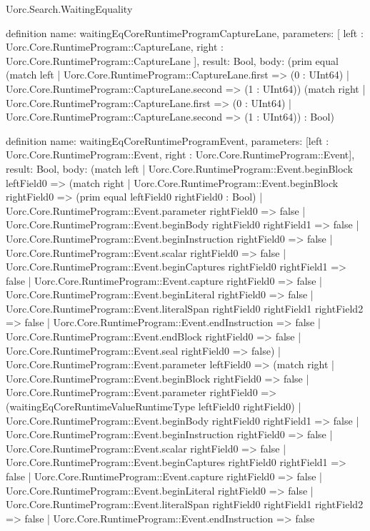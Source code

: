 \begin{lexlean}{Uorc.Search.WaitingEquality}
\begin{semanticmodule}
definition{
  name: waitingEqCoreRuntimeProgramCaptureLane,
  parameters: [
    left : Uorc.Core.RuntimeProgram::CaptureLane,
    right : Uorc.Core.RuntimeProgram::CaptureLane
  ],
  result: Bool,
  body: (prim equal (match left
    | Uorc.Core.RuntimeProgram::CaptureLane.first => (0 : UInt64)
    | Uorc.Core.RuntimeProgram::CaptureLane.second => (1 : UInt64)) (match right
    | Uorc.Core.RuntimeProgram::CaptureLane.first => (0 : UInt64)
    | Uorc.Core.RuntimeProgram::CaptureLane.second => (1 : UInt64)) : Bool)
}

definition{
  name: waitingEqCoreRuntimeProgramEvent,
  parameters: [left : Uorc.Core.RuntimeProgram::Event, right : Uorc.Core.RuntimeProgram::Event],
  result: Bool,
  body: (match left
    | Uorc.Core.RuntimeProgram::Event.beginBlock leftField0 => (match right
      | Uorc.Core.RuntimeProgram::Event.beginBlock rightField0 => (prim equal leftField0 rightField0 : Bool)
      | Uorc.Core.RuntimeProgram::Event.parameter rightField0 => false
      | Uorc.Core.RuntimeProgram::Event.beginBody rightField0 rightField1 => false
      | Uorc.Core.RuntimeProgram::Event.beginInstruction rightField0 => false
      | Uorc.Core.RuntimeProgram::Event.scalar rightField0 => false
      | Uorc.Core.RuntimeProgram::Event.beginCaptures rightField0 rightField1 => false
      | Uorc.Core.RuntimeProgram::Event.capture rightField0 => false
      | Uorc.Core.RuntimeProgram::Event.beginLiteral rightField0 => false
      | Uorc.Core.RuntimeProgram::Event.literalSpan rightField0 rightField1 rightField2 => false
      | Uorc.Core.RuntimeProgram::Event.endInstruction => false
      | Uorc.Core.RuntimeProgram::Event.endBlock rightField0 => false
      | Uorc.Core.RuntimeProgram::Event.seal rightField0 => false)
    | Uorc.Core.RuntimeProgram::Event.parameter leftField0 => (match right
      | Uorc.Core.RuntimeProgram::Event.beginBlock rightField0 => false
      | Uorc.Core.RuntimeProgram::Event.parameter rightField0 => (waitingEqCoreRuntimeValueRuntimeType leftField0 rightField0)
      | Uorc.Core.RuntimeProgram::Event.beginBody rightField0 rightField1 => false
      | Uorc.Core.RuntimeProgram::Event.beginInstruction rightField0 => false
      | Uorc.Core.RuntimeProgram::Event.scalar rightField0 => false
      | Uorc.Core.RuntimeProgram::Event.beginCaptures rightField0 rightField1 => false
      | Uorc.Core.RuntimeProgram::Event.capture rightField0 => false
      | Uorc.Core.RuntimeProgram::Event.beginLiteral rightField0 => false
      | Uorc.Core.RuntimeProgram::Event.literalSpan rightField0 rightField1 rightField2 => false
      | Uorc.Core.RuntimeProgram::Event.endInstruction => false
}
\end{semanticmodule}
\end{lexlean}
